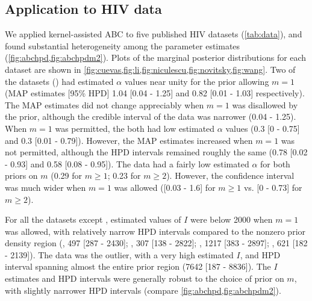 %
%
%    

\subsection{Application to HIV data}



We applied kernel-assisted ABC to five published HIV datasets (\cref{tab:data}),
and found substantial heterogeneity among the parameter estimates
(\cref{fig:abchpd,fig:abchpdm2}). Plots of the marginal posterior distributions
for each dataset are shown in
\cref{fig:cuevas,fig:li,fig:niculescu,fig:novitsky,fig:wang}.
Two of the datasets (\textcite{niculescu2015recent, wang2015targeting}) had
estimated $\alpha$ values near unity for the prior allowing $m = 1$ (\gls{MAP}
estimates [95\% \gls{HPD}] 
  1.04 
  [0.04 - 
   1.25]
and
  0.82 
  [0.01 -
   1.03] respectively).
The MAP estimates did not change appreciably when $m = 1$ was disallowed by the
prior, although the credible interval of the \textcite{niculescu2015recent}
data was narrower
  (0.04 - 
   1.25).
When $m = 1$ was permitted, the \textcite{li2015hiv, cuevas2009hiv} both had
low estimated $\alpha$ values
  (0.3 
  [0 - 
  0.75]
and
  0.3 
  [0.01 -
   0.79]). 
However, the MAP estimates increased when $m = 1$ was not permitted, although
the HPD intervals remained roughly the same
  (0.78 
  [0.02 - 
  0.93]
and
  0.58 
  [0.08 -
   0.95]).
The \textcite{novitsky2014impact} data had a fairly low estimated $\alpha$
for both priors on $m$
  (0.29 for $m \geq 1$;
   0.23 for $m \geq 2$).
However, the confidence interval was much wider when $m = 1$ was allowed
  ([0.03 -
    1.6] for $m \geq 1$ vs.
   [0 -
    0.73] for $m \geq 2$).

For all the datasets except \citeauthor{novitsky2014impact}, estimated values
of $I$ were below 2000 when $m = 1$ was allowed, with relatively narrow HPD
intervals compared to the nonzero prior density region
  (\citeauthor{cuevas2009hiv}, 497 
  [287 -
   2430];
   \citeauthor{niculescu2015recent}, 307
  [138 - 
   2822];
  \citeauthor{li2015hiv}, 1217 
  [383 -
   2897];
   \citeauthor{wang2015targeting}, 621
  [182 - 
   2139]).
The \citeauthor{novitsky2014impact} data was the outlier, with a very high
estimated $I$, and HPD interval spanning almost the entire prior region
  (7642 
  [187 -
   8836]).
The $I$ estimates and HPD intervals were generally robust to the choice of
prior on $m$, with slightly narrower HPD intervals (compare
\cref{fig:abchpd,fig:abchpdm2}).

